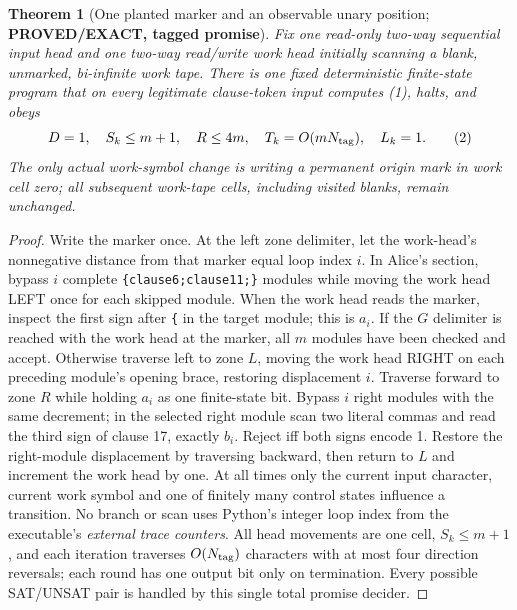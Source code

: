 \documentclass[11pt]{article}
\newtheorem{theorem}{Theorem}
\begin{document}
\begin{theorem}[One planted marker and an observable unary position;
\textbf{PROVED/EXACT, tagged promise}]
Fix one read-only two-way sequential input head and one two-way read/write
work head initially scanning a blank, unmarked, bi-infinite work tape. There
is one fixed deterministic finite-state program that on every legitimate
clause-token input computes (1), halts, and obeys
\[
 D=1,\quad S_k\le m+1,\quad R\le4m,
 \quad T_k=O(mN_{\rm tag}),\quad L_k=1.\tag{2}
\]
The only actual work-symbol change is writing a permanent origin mark in
work cell zero; all subsequent work-tape cells, including visited blanks,
remain unchanged.
\end{theorem}
\begin{proof}
Write the marker once. At the left zone delimiter, let the work-head's
nonnegative distance from that marker equal loop index $i$. In Alice's
section, bypass $i$ complete \texttt{\{clause6;clause11;\}} modules while
moving the work head LEFT once for each skipped module. When the work head
reads the marker, inspect the first sign after \texttt{\{} in the target
module; this is $a_i$. If the $G$ delimiter is reached with the work head
at the marker, all $m$ modules have been checked and accept. Otherwise
traverse left to zone $L$, moving the work head RIGHT on each preceding
module's opening brace, restoring displacement $i$. Traverse forward to
zone $R$ while holding $a_i$ as one finite-state bit. Bypass $i$ right modules
with the same decrement; in the selected right module scan two literal commas
and read the third sign of clause 17, exactly $b_i$. Reject iff both signs
encode 1. Restore the right-module displacement by traversing backward,
then return to $L$ and increment the work head by one. At all times only the
current input character, current work symbol and one of finitely many
control states influence a transition. No branch or scan uses Python's
integer loop index from the executable's \emph{external trace counters}.
All head movements are one cell, $S_k\le m+1$, and each iteration traverses
$O(N_{\rm tag})$ characters with at most four direction reversals; each
round has one output bit only on termination. Every possible SAT/UNSAT
pair is handled by this single total promise decider.
\end{proof}
\end{document}
